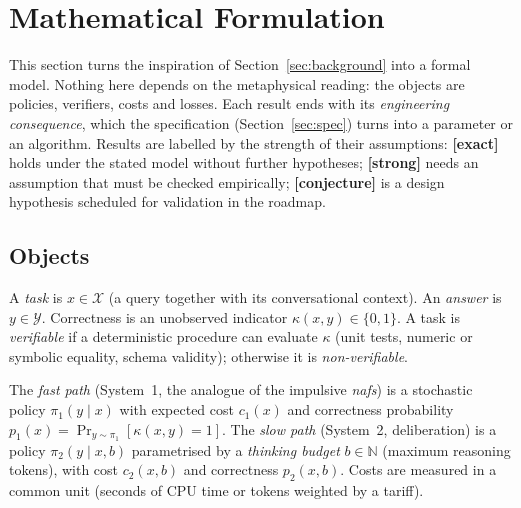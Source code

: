 \section{Mathematical Formulation}
\label{sec:math}

This section turns the inspiration of Section~\ref{sec:background} into a formal
model. Nothing here depends on the metaphysical reading: the objects are
policies, verifiers, costs and losses. Each result ends with its
\emph{engineering consequence}, which the specification (Section~\ref{sec:spec})
turns into a parameter or an algorithm. Results are labelled by the strength of
their assumptions: \textbf{[exact]} holds under the stated model without further
hypotheses; \textbf{[strong]} needs an assumption that must be checked
empirically; \textbf{[conjecture]} is a design hypothesis scheduled for
validation in the roadmap.

\subsection{Objects}
\label{sec:objects}

\begin{definition}
A \emph{task} is $x\in\mathcal X$ (a query together with its conversational
context). An \emph{answer} is $y\in\mathcal Y$. Correctness is an unobserved
indicator $\kappa(x,y)\in\{0,1\}$. A task is \emph{verifiable} if a deterministic
procedure can evaluate $\kappa$ (unit tests, numeric or symbolic equality,
schema validity); otherwise it is \emph{non-verifiable}.
\end{definition}

\begin{definition}
The \emph{fast path} (System~1, the analogue of the impulsive
\emph{nafs}) is a stochastic policy $\pi_1(y\mid x)$ with expected cost
$c_1(x)$ and correctness probability $p_1(x)=\Pr_{y\sim\pi_1}[\kappa(x,y)=1]$.
The \emph{slow path} (System~2, deliberation) is a policy $\pi_2(y\mid x,b)$
parametrised by a \emph{thinking budget} $b\in\mathbb N$ (maximum reasoning
tokens), with cost $c_2(x,b)$ and correctness $p_2(x,b)$. Costs are measured in
a common unit (seconds of CPU time or tokens weighted by a tariff).
\end{definition}

